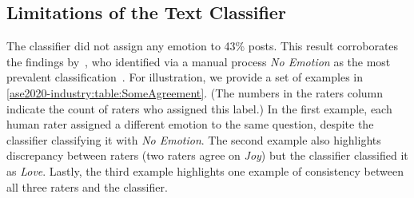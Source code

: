 \subsection{Limitations of the Text Classifier}
The classifier did not assign any emotion to 43\% posts.  This result corroborates the findings by~\citeauthor{murgia2014}, who identified via a manual process \textit{No Emotion} as the most prevalent classification~\citep{murgia2014}. For illustration, we provide a set of examples in \cref{ase2020-industry:table:SomeAgreement}. (The numbers in the raters column indicate the count of raters who assigned this label.) In the first example, each human rater assigned a different emotion to the same question, despite the classifier classifying it with \textit{No Emotion}. The second example also highlights discrepancy between raters (two raters agree on \textit{Joy}) but the classifier classified it as \textit{Love}. Lastly, the third example highlights one example of consistency between all three raters and the classifier.

